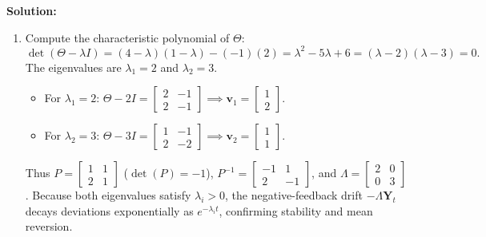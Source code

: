 \documentclass[11pt, letterpaper]{article}
\theoremstyle{definition}
\theoremstyle{remark}
\begin{document}
\textbf{Solution:}
\begin{enumerate}[label=(\alph*)]
    \item Compute the characteristic polynomial of $\Theta$:
    \[
    \det(\Theta - \lambda I) = (4 - \lambda)(1 - \lambda) - (-1)(2) = \lambda^{2} - 5\lambda + 6 = (\lambda - 2)(\lambda - 3) = 0.
    \]
    The eigenvalues are $\lambda_{1} = 2$ and $\lambda_{2} = 3$.
    \begin{itemize}
        \item For $\lambda_{1} = 2$: $\Theta - 2I = \begin{bmatrix} 2 & -1 \\ 2 & -1 \end{bmatrix} \implies \mathbf{v}_{1} = \begin{bmatrix} 1 \\ 2 \end{bmatrix}$.
        \item For $\lambda_{2} = 3$: $\Theta - 3I = \begin{bmatrix} 1 & -1 \\ 2 & -2 \end{bmatrix} \implies \mathbf{v}_{2} = \begin{bmatrix} 1 \\ 1 \end{bmatrix}$.
    \end{itemize}
    Thus $P = \begin{bmatrix} 1 & 1 \\ 2 & 1 \end{bmatrix}$ ($\det(P) = -1$), $P^{-1} = \begin{bmatrix} -1 & 1 \\ 2 & -1 \end{bmatrix}$, and $\Lambda = \begin{bmatrix} 2 & 0 \\ 0 & 3 \end{bmatrix}$. Because both eigenvalues satisfy $\lambda_{i} > 0$, the negative-feedback drift $-\Lambda\mathbf{Y}_{t}$ decays deviations exponentially as $e^{-\lambda_{i} t}$, confirming stability and mean reversion.


\end{enumerate}
\end{document}
